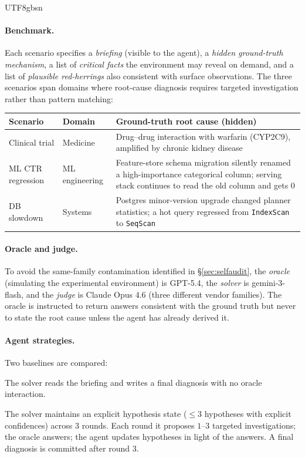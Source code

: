 \documentclass{article}
\begin{document}
\begin{CJK*}{UTF8}{gbsn}
\paragraph{Benchmark.} Each scenario specifies a \emph{briefing}
(visible to the agent), a \emph{hidden ground-truth mechanism}, a
list of \emph{critical facts} the environment may reveal on demand,
and a list of \emph{plausible red-herrings} also consistent with
surface observations. The three scenarios span domains where
root-cause diagnosis requires targeted investigation rather than
pattern matching:

\begin{center}\small
\begin{tabular}{l l p{4.5cm}}
  \toprule
  Scenario & Domain & Ground-truth root cause (hidden) \\
  \midrule
  Clinical trial & Medicine &
    Drug--drug interaction with warfarin (CYP2C9), amplified by
    chronic kidney disease \\
  ML CTR regression & ML engineering &
    Feature-store schema migration silently renamed a high-importance
    categorical column; serving stack continues to read the old
    column and gets \(0\) \\
  DB slowdown & Systems &
    Postgres minor-version upgrade changed planner statistics;
    a hot query regressed from \texttt{IndexScan} to \texttt{SeqScan} \\
  \bottomrule
\end{tabular}
\end{center}

\paragraph{Oracle and judge.} To avoid the same-family contamination
identified in \S\ref{sec:selfaudit}, the \emph{oracle} (simulating the
experimental environment) is GPT-5.4, the \emph{solver} is
gemini-3-flash, and the \emph{judge} is Claude Opus 4.6
(three different vendor families). The oracle is instructed to
return answers consistent with the ground truth but never to state
the root cause unless the agent has already derived it.

\paragraph{Agent strategies.} Two baselines are compared:
\begin{description}[leftmargin=1.5em, topsep=2pt, itemsep=1pt]
  \item[\textbf{single\_pass}:] The solver reads the briefing and
    writes a final diagnosis with no oracle interaction.
  \item[\textbf{belief\_track}:] The solver maintains an explicit
    hypothesis state (\(\leq 3\) hypotheses with explicit
    confidences) across \(3\) rounds. Each round it proposes
    \(1\text{--}3\) targeted investigations; the oracle answers;
    the agent updates hypotheses in light of the answers. A final
    diagnosis is committed after round \(3\).
\end{description}


\end{CJK*}
\end{document}
